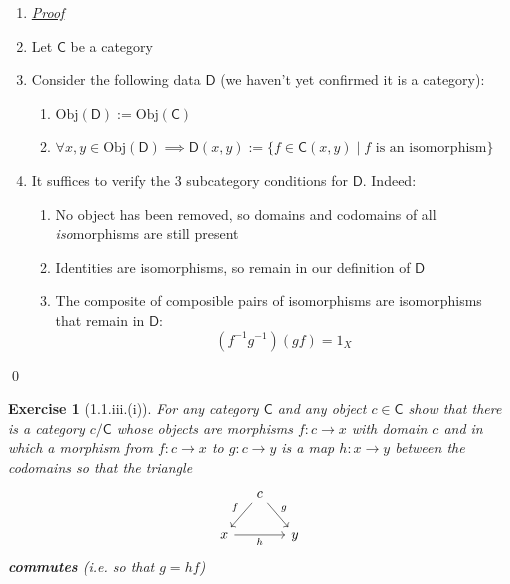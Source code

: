 \documentclass{article}
\theoremstyle{spacious}
\newtheorem*{prm}{Exercise}
\newenvironment{pf}{\begin{enumerate} \item[] \textit{\underline{Proof}} }{\end{enumerate}\qed}
\renewcommand{\:}{\vcentcolon=} %
\begin{document}
\begin{pf}{}
    \item[] Let \(\mathsf{C}\) be a category
    \item[] Consider the following data \(\mathsf{D}\) (we haven't yet confirmed it is a category): 
    \begin{enumerate}
    \item[] \(\mathrm{Obj}\left(\mathsf{D}\right):=\mathrm{Obj}\left(\mathsf{C}\right)\)
    \item[] \(\forall x,y\in\mathrm{Obj}\left(\mathsf{D}\right)\bm{\implies}\mathsf{D}\left(x,y\right):=\{f \in \mathsf{C}\left(x,y\right) \mid f \text{ is an isomorphism}\}\)
    \end{enumerate}
    
    \item[] It suffices to verify the $3$ subcategory conditions for \(\mathsf{D}\).  Indeed:
    \begin{enumerate}
    \item[(i)] No object has been removed, so domains and codomains of all \textit{iso}morphisms are still present
    \item[(ii)] Identities are isomorphisms, so remain in our definition of \(\mathsf{D}\)
    \item[(iii)] The composite of composible pairs of isomorphisms are isomorphisms that remain in \(\mathsf{D}\):\[(f^{-1}g^{-1})(gf)=1_X\]    
    \end{enumerate}
\end{pf}

\begin{prm}[1.1.iii.(i)]
    For any category \(\mathsf{C}\) and any object \(c\in \mathsf{C}\) show that there is a category \(c/ \mathsf{C}\) whose objects are morphisms \(f: c\to x\) with domain \(c\) and in which a morphism from \(f:c \to x\) to \(g:c \to y\) is a map \(h:x\to y\) between the codomains so that the triangle
        \[
        \begin{tikzcd}[column sep=small]
                        & c \ar[dl,"f"'] \ar[dr,"g"]     & \\
            x \ar[rr,"h"']   &                       & y
        \end{tikzcd}
        \]
        \textbf{commutes} (i.e. so that \(g=hf\))
\end{prm}
\end{document}
